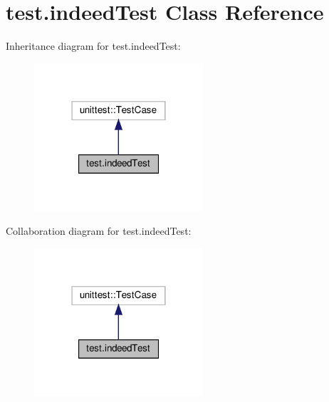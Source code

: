 \hypertarget{classtest_1_1indeedTest}{}\section{test.\+indeed\+Test Class Reference}
\label{classtest_1_1indeedTest}


Inheritance diagram for test.\+indeed\+Test\+:
\nopagebreak
\begin{figure}[H]
\begin{center}
\leavevmode
\includegraphics[width=178pt]{classtest_1_1indeedTest__inherit__graph}
\end{center}
\end{figure}


Collaboration diagram for test.\+indeed\+Test\+:
\nopagebreak
\begin{figure}[H]
\begin{center}
\leavevmode
\includegraphics[width=178pt]{classtest_1_1indeedTest__coll__graph}
\end{center}
\end{figure}

